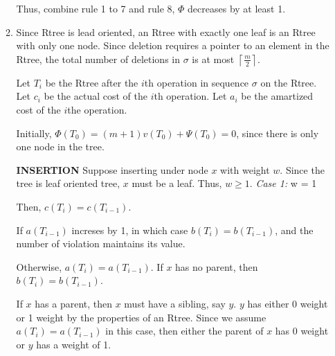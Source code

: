 \documentclass[10pt]{article}
\begin{document}
\begin{enumerate}
\begin{enumerate}
				Thus, combine rule 1 to 7 and rule 8, $\Phi$ decreases by at least 1.
			
			\item %
				Since Rtree is lead oriented, an Rtree with exactly one leaf is an Rtree with only one node.
				Since deletion requires a pointer to an element in the Rtree, the total number of deletions in $\sigma$ is at most $\left\lceil \frac{m}{2} \right\rceil$.
				
				Let $T_i$ be the Rtree after the $i$th operation in sequence $\sigma$ on the Rtree.
				Let $c_i$ be the actual cost of the $i$th operation.
				Let $a_i$ be the amartized cost of the $i$the operation.

				Initially, $\Phi(T_0) = (m+1)v(T_0) + \Psi(T_0) = 0$, since there is only one node in the tree.

				\textbf{INSERTION}
					Suppose inserting under node $x$ with weight $w$. 
					Since the tree is leaf oriented tree, $x$ must be a leaf.
					Thus, $w \geq 1$.
					\textit{Case 1:} w = 1
					\begin{addmargin}[1em]{0em}
						Then, $c(T_i) = c(T_{i-1})$.

						If $a(T_{i-1})$ increses by 1, in which case $b(T_i) = b(T_{i-1})$, and the number of violation maintains its value.

						Otherwise, $a(T_i) = a(T_{i-1})$.
						If $x$ has no parent, then $b(T_i) = b (T_{i-1})$.

						If $x$ has a parent, then $x$ must have a sibling, say $y$.
						$y$ has either 0 weight or 1 weight by the properties of an Rtree.
						Since we assume $a(T_i) = a(T_{i-1})$ in this case, then either the parent of $x$ has 0 weight or $y$ has a weight of 1.

					\end{addmargin}
		\end{enumerate}
\end{enumerate}
\end{document}
